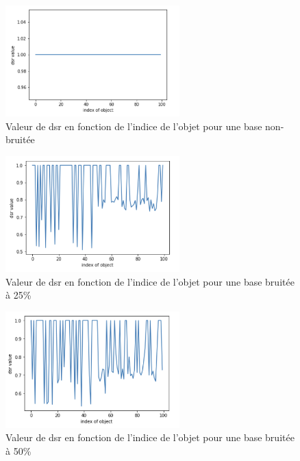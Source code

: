 \documentclass[a4paper]{article}
\begin{document}
\begin{figure}[H]
	\center 
	\includegraphics[width=0.6\textwidth]{images/dsr_0.png}
    \caption{Valeur de dsr en fonction de l'indice de l'objet pour une base
    non-bruitée}
    \label{img:dsr0}
\end{figure}


\begin{figure}[H]
	\center 
	\includegraphics[width=0.6\textwidth]{images/dsr_25.png}
    \caption{Valeur de dsr en fonction de l'indice de l'objet pour une base
    bruitée à 25\%}
    \label{img:dsr25}
\end{figure}

\begin{figure}[H]
	\center 
	\includegraphics[width=0.6\textwidth]{images/dsr_50.png}
    \caption{Valeur de dsr en fonction de l'indice de l'objet pour une base
    bruitée à 50\%}
    \label{img:dsr50}
\end{figure}
\end{document}
